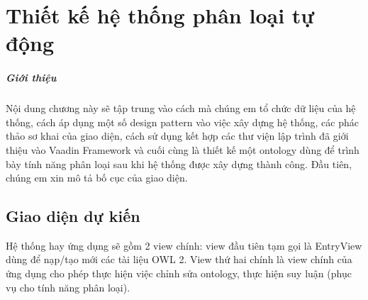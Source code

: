 \chapter{Thiết kế hệ thống phân loại tự động}
\paragraph{Giới thiệu} Nội dung chương này sẽ tập trung vào cách mà chúng em tổ chức dữ liệu của hệ thống, cách áp dụng một số design pattern vào việc xây dựng hệ thống, các phác thảo sơ khai của giao diện, cách sử dụng kết hợp các thư viện lập trình đã giới thiệu vào Vaadin Framework và cuối cùng là thiết kế một ontology dùng để trình bày tính năng phân loại sau khi hệ thống được xây dựng thành công. Đầu tiên, chúng em xin mô tả bố cục của giao diện.
\section{Giao diện dự kiến}
Hệ thống hay ứng dụng sẽ gồm 2 view chính: view đầu tiên tạm gọi là EntryView dùng để nạp/tạo mới các tài liệu OWL 2. View thứ hai chính là view chính của ứng dụng cho phép thực hiện việc chỉnh sửa ontology, thực hiện suy luận (phục vụ cho tính năng phân loại).


 